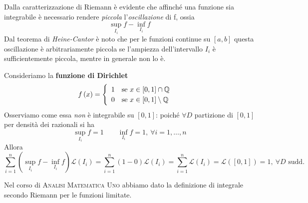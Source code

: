 Dalla caratterizzazione di Riemann è evidente che affinché una funzione sia integrabile è necessario rendere \textit{piccola} l’\textit{oscillazione} di f, ossia
\begin{equation*}
	\sup_{I_i}f-\inf_{I_i}f
\end{equation*}
Dal teorema di \textit{Heine-Cantor} è noto che per le funzioni continue su $\left[a,b\right]$ questa oscillazione è arbitrariamente piccola se l’ampiezza dell’intervallo $I_i$ è
sufficientemente piccola, mentre in generale non lo è.
\begin{examplewt}\label{funzionedirichlet}
	Consideriamo la \textbf{funzione di Dirichlet}
	\begin{equation}
		f\left(x\right)=
		\begin{cases}
			\begin{array}{ll}
				1&\text{se }x\in\left[0,1\right]\cap\mathbb{Q}\\
				0&\text{se }x\in\left[0,1\right]\setminus\mathbb{Q}\\
			\end{array}
		\end{cases}
	\end{equation}
Osserviamo come essa \textit{non} è integrabile su $\left[0,1\right]$: poiché $\forall D$ partizione di $\left[0,1\right]$ per densità dei razionali si ha
\begin{equation*}
	\sup_{I_i}f=1\qquad	\inf_{I_i}f=1,\ \forall i=1,\ldots,n
\end{equation*}
Allora
\begin{equation*}
	\sum_{i=1}^{n}\left(\sup_{I_i}f-\inf_{I_i}f\right)\mathcal{L}\left(I_i\right)=\sum_{i=1}^{n}\left(1-0\right)\mathcal{L}\left(I_i\right)=\sum_{i=1}^{n}\mathcal{L}\left(I_i\right)=\mathcal{L}\left(\left[0,1\right]\right)=1,\ \forall D\text{ sudd.}
\end{equation*}
\end{examplewt}
Nel corso di \textsc{Analisi Matematica Uno} abbiamo dato la definizione di integrale secondo Riemann per le funzioni limitate. %
